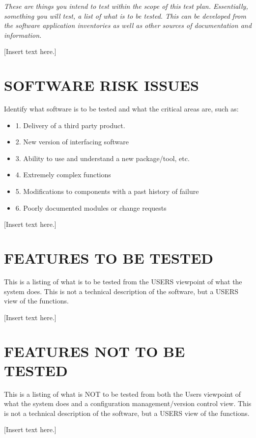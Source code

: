 {\itshape\color{black}
These are things you intend to test within the scope of this test
plan. Essentially, something you will test, a list of what is to be
tested. This can be developed from the software application
inventories as well as other sources of documentation and information.
}

{\color{black}
[Insert text here.]}

\section[SOFTWARE RISK ISSUES]{\bfseries\color{black} SOFTWARE RISK ISSUES}
{\itshape\color{black}

Identify what software is to be tested and what the critical areas
are, such as:

\begin{itemize}
\item   1. Delivery of a third party product.
\item   2. New version of interfacing software
\item   3. Ability to use and understand a new package/tool, etc.
\item   4. Extremely complex functions
\item   5. Modifications to components with a past history of failure
\item   6. Poorly documented modules or change requests 
\end{itemize}
}
{\color{black}
[Insert text here.]}

\section[FEATURES TO BE TESTED]{\bfseries\color{black} FEATURES TO BE TESTED}
{\itshape\color{black}

This is a listing of what is to be tested from the USERS viewpoint of
what the system does. This is not a technical description of the
software, but a USERS view of the functions.

}
{\color{black}
[Insert text here.]}

\section[FEATURES NOT TO BE TESTED]{\bfseries\color{black}
	 FEATURES NOT TO BE TESTED}
{\itshape\color{black}

This is a listing of what is NOT to be tested from both the Users
viewpoint of what the system does and a configuration
management/version control view. This is not a technical description
of the software, but a USERS view of the functions.

}
{\color{black}
[Insert text here.]}

